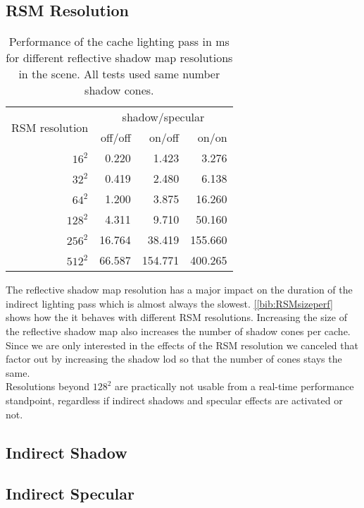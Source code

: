 \documentclass[thesis.tex]{subfiles}
\begin{document}
\subsection{RSM Resolution}
\begin{table}[htbp]
  \centering
    \begin{tabular}{r|rrr}
    \toprule
    \multirow{2}{*}{RSM resolution} & \multicolumn{3}{c}{ shadow/specular}\\
     & off/off & on/off & on/on \\
    \midrule
    $16^2$    & 0.220 & 1.423 & 3.276 \\
    $32^2$    & 0.419 & 2.480 & 6.138 \\
    $64^2$    & 1.200 & 3.875 & 16.260 \\
    $128^2$   & 4.311 & 9.710 & 50.160 \\
    $256^2$   & 16.764 & 38.419 & 155.660 \\
    $512^2$   & 66.587 & 154.771 & 400.265 \\
    \bottomrule
    \end{tabular}
\caption{Performance of the cache lighting pass in ms for different reflective shadow map resolutions in the  scene. All tests used same number shadow cones. }
\label{bib:RSMsizeperf}
\end{table}
The reflective shadow map resolution has a major impact on the duration of the indirect lighting pass which is almost always the slowest.
\autoref{[bib:RSMsizeperf} shows how the it behaves with different RSM resolutions.
Increasing the size of the reflective shadow map also increases the number of shadow cones per cache.
Since we are only interested in the effects of the RSM resolution we canceled that factor out by increasing the shadow lod so that the number of cones stays the same.
\\
Resolutions beyond $128^2$ are practically not usable from a real-time performance standpoint, regardless if indirect shadows and specular effects are activated or not.

\subsection{Indirect Shadow}

\subsection{Indirect Specular}
\end{document}

